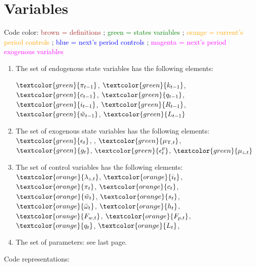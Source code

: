 





\section{Variables}
Code color: \textcolor{brown}{brown = definitions} ; \textcolor{green}{green = states variables} ; \textcolor{orange}{orange = current's period controls} ; \textcolor{blue}{blue = next's period controls} ; \textcolor{magenta}{magenta = next's period exogenous variables}

\begin{enumerate}
	\item The set of endogenous state variables has the following elements:

	$\textcolor{green}{\pi_{t-1}}$, $\textcolor{green}{k_{t-1}}$, $\textcolor{green}{c_{t-1}}$, $\textcolor{green}{q_{t-1}}$, $\textcolor{green}{i_{t-1}}$, $\textcolor{green}{R_{t-1}}$, $\textcolor{green}{\tilde{w}_{t-1}}$, $\textcolor{green}{L_{t-1}}$

	\item The set of exogenous state variables has the following elements:
	 $\textcolor{green}{\epsilon_t}$, , $\textcolor{green}{\mu_{\Upsilon,t}}$, $\textcolor{green}{g_t}$,  $\textcolor{green}{\epsilon_t^p}$, $\textcolor{green}{\mu_{z,t}}$


	\item The set of control variables has the following elements:
           $ \textcolor{orange}{\lambda_{z,t}} $,
           $ \textcolor{orange}{i_t} $,
           $ \textcolor{orange}{\pi_t}  $,
           $ \textcolor{orange}{c_t} $,
           $ \textcolor{orange}{\tilde{w}_t} $,
           $ \textcolor{orange}{s_t} $,
           $ \textcolor{orange}{\bar{\omega}_t} $,
           $ \textcolor{orange}{h_t} $,
           $ \textcolor{orange}{F_{w,t}} $,
           $\textcolor{orange}{F_{p,t}} $,
           $\textcolor{orange}{q_t} $,
           $\textcolor{orange}{L_t} $,

	\item The set of parameters: see last page. 
 
\end{enumerate}

Code representations:

